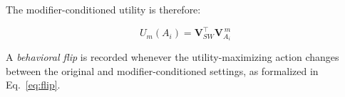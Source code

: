 \documentclass[11pt]{article}
\begin{document}
The modifier-conditioned utility is therefore:

\begin{equation}
\label{eq:Um}
U_m(A_i)
=
\mathbf{V}_{SW}^{\top}
\mathbf{V}_{A_i}^{\,m}
\end{equation}

A \emph{behavioral flip} is recorded whenever the utility-maximizing action changes between the original and modifier-conditioned settings, as formalized in Eq.~\eqref{eq:flip}.



\end{document}
